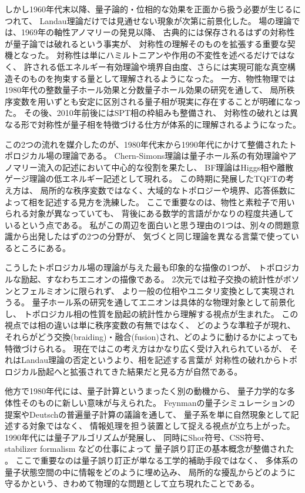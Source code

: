 \documentclass[../master.tex]{subfiles}
\begin{document}
しかし1960年代末以降、量子論的・位相的な効果を正面から扱う必要が生じるにつれて、
Landau理論だけでは見通せない現象が次第に前景化した。
場の理論では、1969年の軸性アノマリーの発見以降、
古典的には保存されるはずの対称性が量子論では破れるという事実が、
対称性の理解そのものを拡張する重要な契機となった。
対称性は単にハミルトニアンや作用の不変性を述べるだけではなく、
許される低エネルギー有効理論や境界自由度、さらには実現可能な真空構造そのものを拘束する量として理解されるようになった。
一方、物性物理では1980年代の整数量子ホール効果と分数量子ホール効果の研究を通して、
局所秩序変数を用いずとも安定に区別される量子相が現実に存在することが明確になった。
その後、2010年前後にはSPT相の枠組みも整備され、
対称性の破れとは異なる形で対称性が量子相を特徴づける仕方が体系的に理解されるようになった。

この2つの流れを媒介したのが、1980年代末から1990年代にかけて整備されたトポロジカル場の理論である。
Chern-Simons理論は量子ホール系の有効理論やアノマリー流入の記述において中心的な役割を果たし、
BF理論はHiggs相や離散ゲージ理論の低エネルギー記述として現れる。
この時期に発展したTQFTの考え方は、
局所的な秩序変数ではなく、大域的なトポロジーや境界、応答係数によって相を記述する見方を洗練した。
ここで重要なのは、物性と素粒子で用いられる対象が異なっていても、
背後にある数学的言語がかなりの程度共通しているという点である。
私がこの周辺を面白いと思う理由の1つは、別々の問題意識から出発したはずの2つの分野が、
気づくと同じ理論を異なる言葉で使っているところにある。

こうしたトポロジカル場の理論が与えた最も印象的な描像の1つが、
トポロジカルな励起、すなわちエニオンの描像である。
2次元では粒子交換の統計性がボソンとフェルミオンに限られず、
より一般の位相やユニタリ変換として実現されうる。
量子ホール系の研究を通してエニオンは具体的な物理対象として前景化し、
トポロジカル相の性質を励起の統計性から理解する視点が生まれた。
この視点では相の違いは単に秩序変数の有無ではなく、
どのような準粒子が現れ、それらがどう交換(braiding)・融合(fusion)され、どのように動けるかによっても特徴づけられる。
現在ではこの考え方はかなり広く受け入れられているが、
それはLandau理論の否定というより、相を記述する言葉が
対称性の破れからトポロジカル励起へと拡張されてきた結果だと見る方が自然である。

他方で1980年代には、量子計算というまったく別の動機から、
量子力学的な多体性そのものに新しい意味が与えられた。
Feynmanの量子シミュレーションの提案やDeutschの普遍量子計算の議論を通して、
量子系を単に自然現象として記述する対象ではなく、
情報処理を担う装置として捉える視点が立ち上がった。
1990年代には量子アルゴリズムが発展し、
同時にShor符号、CSS符号、stabilizer formalism などの仕事によって
量子誤り訂正の基本概念が整備された
\cite{Shor1995-ii,Calderbank1996-si,Steane1996-is,Gottesman1997-ep}。
ここで重要なのは量子誤り訂正が単なる工学的補助手段ではなく、
多体系の量子状態空間の中に情報をどのように埋め込み、
局所的な擾乱からどのように守るかという、きわめて物理的な問題として立ち現れたことである。
\end{document}
